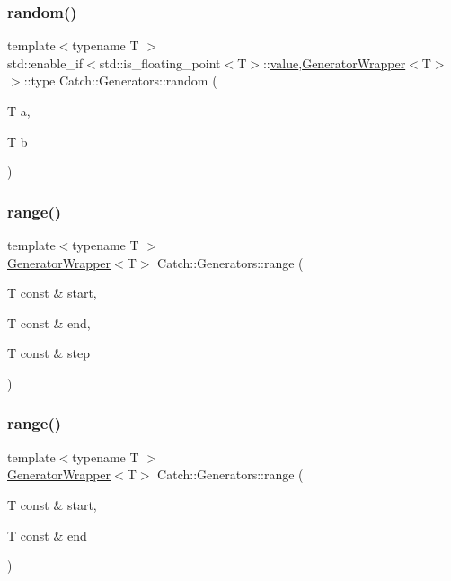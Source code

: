 \subsubsection{\texorpdfstring{random()}{random()}\hspace{0.1cm}{\footnotesize\ttfamily [2/2]}}
{\footnotesize\ttfamily template$<$typename T $>$ \\
std\+::enable\+\_\+if$<$std\+::is\+\_\+floating\+\_\+point$<$T$>$\+::\mbox{\hyperlink{namespace_catch_1_1_generators_a3c4989dd0dca44455f55484cedaa18da}{value}},\mbox{\hyperlink{class_catch_1_1_generators_1_1_generator_wrapper}{Generator\+Wrapper}}$<$T$>$ $>$\+::type Catch\+::\+Generators\+::random (\begin{DoxyParamCaption}\item[{T}]{a,  }\item[{T}]{b }\end{DoxyParamCaption})}

\mbox{\label{namespace_catch_1_1_generators_a3c79134931f824e63588bfa5baa77a43}} 
\subsubsection{\texorpdfstring{range()}{range()}\hspace{0.1cm}{\footnotesize\ttfamily [1/2]}}
{\footnotesize\ttfamily template$<$typename T $>$ \\
\mbox{\hyperlink{class_catch_1_1_generators_1_1_generator_wrapper}{Generator\+Wrapper}}$<$T$>$ Catch\+::\+Generators\+::range (\begin{DoxyParamCaption}\item[{T const \&}]{start,  }\item[{T const \&}]{end,  }\item[{T const \&}]{step }\end{DoxyParamCaption})}

\mbox{\label{namespace_catch_1_1_generators_a75b1b4ab3b52a8d99f9d049824500371}} 
\subsubsection{\texorpdfstring{range()}{range()}\hspace{0.1cm}{\footnotesize\ttfamily [2/2]}}
{\footnotesize\ttfamily template$<$typename T $>$ \\
\mbox{\hyperlink{class_catch_1_1_generators_1_1_generator_wrapper}{Generator\+Wrapper}}$<$T$>$ Catch\+::\+Generators\+::range (\begin{DoxyParamCaption}\item[{T const \&}]{start,  }\item[{T const \&}]{end }\end{DoxyParamCaption})}

